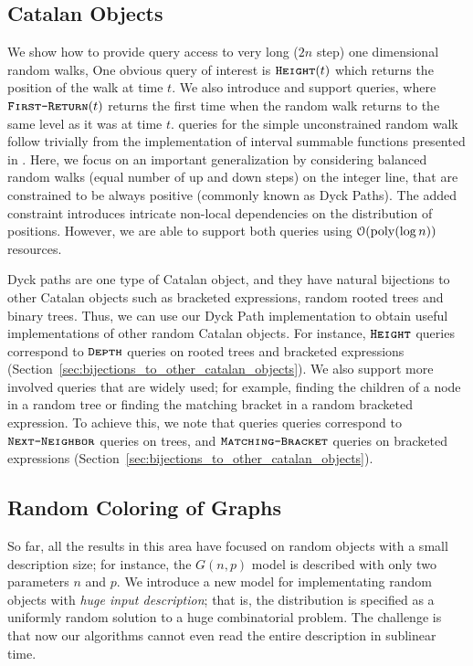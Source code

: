\subsection{Catalan Objects}%
\label{sec:intro_catalan_objects}
We show how to provide query access to very long ($2n$ step) one dimensional random walks,
One obvious query of interest is $\texttt{\textsc{Height}}(t)$ which returns the position of the walk at time $t$.
We also introduce and support  queries, where $\texttt{\textsc{First-Return}}(t)$ returns
the first time when the random walk returns to the same level as it was at time $t$.
 queries for the simple unconstrained random walk
follow trivially from the implementation of interval summable functions presented in \cite{huge}.
Here, we focus on an important generalization by considering balanced random walks (equal number of up and down steps) on the integer line,
that are constrained to be always positive (commonly known as Dyck Paths).
The added constraint introduces intricate non-local dependencies on the distribution of positions.
However, we are able to support both queries using $\mathcal O(\mathrm{poly}(\log n))$ resources.

Dyck paths are one type of Catalan object, and they have natural bijections to other Catalan objects
such as bracketed expressions, random rooted trees and binary trees.
Thus, we can use our Dyck Path implementation to obtain useful implementations of other random Catalan objects.  For instance, $\texttt{\textsc{Height}}$ queries correspond to $\texttt{\textsc{Depth}}$ queries on rooted trees and bracketed expressions
(Section~\ref{sec:bijections_to_other_catalan_objects}).
We also support more involved queries that are widely used; for example, finding the children of a node in a random tree
or finding the matching bracket in a random bracketed expression.
To achieve this, we note that  queries queries correspond to $\texttt{\textsc{Next-Neighbor}}$ queries on trees,
and $\texttt{\textsc{Matching-Bracket}}$ queries on bracketed expressions (Section~\ref{sec:bijections_to_other_catalan_objects}).




\subsection{Random Coloring of Graphs}%
\label{sec:random_coloring_of_graphs}
So far, all the results in this area have focused on random objects with a small description size;
for instance, the $G(n, p)$ model is described with only two parameters $n$ and $p$.
We introduce a new model for implementating random objects with \emph{huge input description};
that is, the distribution is specified as a uniformly random solution to a huge combinatorial problem.
The challenge is that now our algorithms cannot even read the entire description in sublinear time.

